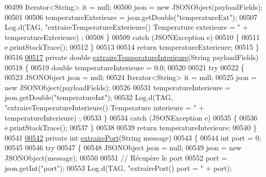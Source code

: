 \begin{DoxyCode}
{{{00499             Iterator<String> it = null;
00500             json = \textcolor{keyword}{new} JSONObject(payloadFields);
00501 
00506             temperatureExterieure = json.getDouble(\textcolor{stringliteral}{"temperatureExt"});
00507             Log.d(TAG, \textcolor{stringliteral}{"extraireTemperatureExterieure() Temperature exterieure = "} + temperatureExterieure)
      ;
00508         \}
00509         \textcolor{keywordflow}{catch} (JSONException e)
00510         \{
00511             e.printStackTrace();
00512         \}
00513 
00514         \textcolor{keywordflow}{return} temperatureExterieure;
00515     \}
00516 
\hyperlink{classcom_1_1example_1_1bee__honeyt_1_1_i_h_m_mobile_a714f52f4793f22a08a773b1bf35dd015}{00517}     \textcolor{keyword}{private} \textcolor{keywordtype}{double} \hyperlink{classcom_1_1example_1_1bee__honeyt_1_1_i_h_m_mobile_a714f52f4793f22a08a773b1bf35dd015}{extraireTemperatureInterieure}(String payloadFields)
00518     \{
00519         \textcolor{keywordtype}{double} temperatureInterieure = 0.0;
00520 
00521         \textcolor{keywordflow}{try}
00522         \{
00523             JSONObject json = null;
00524             Iterator<String> it = null;
00525             json = \textcolor{keyword}{new} JSONObject(payloadFields);
00526 
00531             temperatureInterieure = json.getDouble(\textcolor{stringliteral}{"temperatureInt"});
00532             Log.d(TAG, \textcolor{stringliteral}{"extraireTemperatureInterieure() Temperature interieure = "} + temperatureInterieure)
      ;
00533         \}
00534         \textcolor{keywordflow}{catch} (JSONException e)
00535         \{
00536             e.printStackTrace();
00537         \}
00538 
00539         \textcolor{keywordflow}{return} temperatureInterieure;
00540     \}
00541 
\hyperlink{classcom_1_1example_1_1bee__honeyt_1_1_i_h_m_mobile_abc4571bc8b1400c6d75c0a2594b0abe6}{00542}     \textcolor{keyword}{private} \textcolor{keywordtype}{int} \hyperlink{classcom_1_1example_1_1bee__honeyt_1_1_i_h_m_mobile_abc4571bc8b1400c6d75c0a2594b0abe6}{extrairePort}(String message)
00543     \{
00544         \textcolor{keywordtype}{int} port = 0;
00545 
00546         \textcolor{keywordflow}{try}
00547         \{
00548             JSONObject json = null;
00549             json = \textcolor{keyword}{new} JSONObject(message);
00550 
00551             \textcolor{comment}{// Récupère le port}
00552             port = json.getInt(\textcolor{stringliteral}{"port"});
00553             Log.d(TAG, \textcolor{stringliteral}{"extrairePort() port = "} + port);
}}}
\end{DoxyCode}
